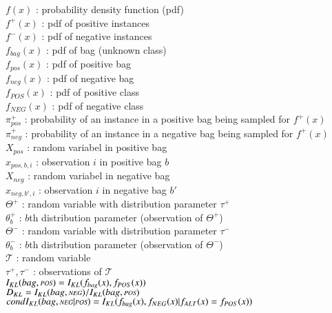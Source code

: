 \noindent $f(x)$ : probability density function (pdf) \\
$f^+(x)$ : pdf of positive instances \\
$f^-(x)$ : pdf of negative instances \\
$f_{bag}(x)$ : pdf of bag (unknown class) \\
$f_{pos}(x)$ : pdf of positive bag \\
$f_{neg}(x)$ : pdf of negative bag \\
$f_{POS} (x) $ : pdf of positive class \\
$f_{NEG} (x) $ : pdf of negative class \\
$\pi_{pos}^+$ : probability of an instance in a positive bag being sampled for $f^+(x)$ \\
$\pi_{neg}^+$ : probability of an instance in a negative bag being sampled for $f^+(x)$ \\
$X_{pos}$ : random variabel in positive bag \\
$x_{pos,b,i}$ : observation $i$ in positive bag $b$ \\
$X_{neg}$ : random variabel in negative bag \\
$x_{neg,{b'},i}$ : observation $i$ in negative bag $b'$ \\
$\Theta^+$ : random variable with distribution parameter $\tau^+$ \\
$\theta_b^+$ : $b$th distribution parameter (observation of $\Theta^+$) \\
$\Theta^-$ : random variable with distribution parameter $\tau^-$ \\
$\theta_b^-$ : $b$th distribution parameter (observation of $\Theta^-$) \\
$\mathcal{T}$ : random variable \\
$\tau^+, \tau^-$ : observations of $\mathcal{T}$ \\

\noindent
$I_{KL}(bag,\text{\scriptsize{{\it POS}}}) = I_{KL}(f_{bag}(x), f_{POS}(x))$ \\
$D_{KL} = I_{KL} (bag,\text{\scriptsize{{\it NEG}}})/I_{KL} (bag,\text{\scriptsize{{\it POS}}}) $\\
$condI_{KL} (bag,\text{\scriptsize{{\it NEG}}}|\text{\scriptsize{{\it POS}}}) = I_{KL} (f_{bag}(x),f_{NEG}(x) | f_{ALT}(x) = f_{POS} (x)) $ \\
 